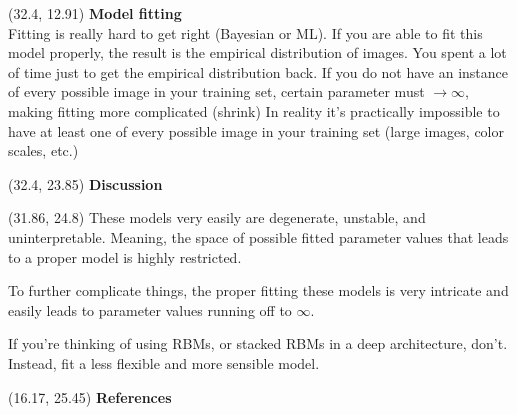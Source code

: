 \documentclass[extrafontsizes, 30pt]{memoir}
\begin{document}
\begin{textblock}{14}(32.4, 12.91)
{\large \bfseries Model fitting} \\[.25cm]
Fitting is really hard to get right (Bayesian or ML).
If you are able to fit this model properly, the result is the empirical distribution of images.
You spent a lot of time just to get the empirical distribution back.
If you do not have an instance of every possible image in your training set, certain parameter must $\rightarrow \infty$, making fitting more complicated (shrink)
In reality it's practically impossible to have at least one of every possible image in your training set (large images, color scales, etc.)

\end{textblock}

\begin{textblock}{14}(32.4, 23.85)
{\large \bfseries Discussion} \\[.25cm]
\end{textblock}

\begin{textblock}{14.54}(31.86, 24.8)
These models very easily are degenerate, unstable, and uninterpretable. Meaning, the space of possible fitted parameter values that leads to a proper model is highly restricted.

To further complicate things, the proper fitting these models is very intricate and easily leads to parameter values running off to $\infty$.

If you're thinking of using RBMs, or stacked RBMs in a deep architecture, don't. Instead, fit a less flexible and more sensible model.
\end{textblock}

\begin{textblock}{14.5}(16.17, 25.45)
{\large \bfseries References}
\printbibliography[heading=none]

\end{textblock}
\end{document}

